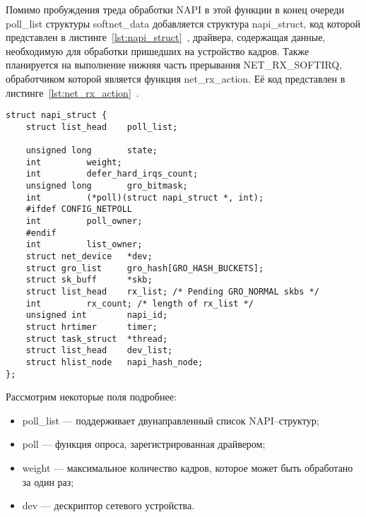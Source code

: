 Помимо пробуждения треда обработки NAPI в этой функции в конец очереди poll\_list структуры  softnet\_data добавляется структура  napi\_struct, код которой представлен в листинге~\ref{lst:napi_struct}~\cite{napi_struct}, драйвера, содержащая данные, необходимую для обработки пришедших на устройство кадров. Также планируется на выполнение нижняя часть прерывания NET\_RX\_SOFTIRQ, обработчиком  которой является функция net\_rx\_action. Её код представлен в листинге~\ref{lst:net_rx_action}~\cite{net_rx_action}.

\begin{center}
	\captionsetup{justification=raggedright,singlelinecheck=off}
	\begin{lstlisting}[label=lst:napi_struct,caption=Структура napi\_struct,showstringspaces=false]
struct napi_struct {
	struct list_head	poll_list;
	
	unsigned long		state;
	int			weight;
	int			defer_hard_irqs_count;
	unsigned long		gro_bitmask;
	int			(*poll)(struct napi_struct *, int);
	#ifdef CONFIG_NETPOLL
	int			poll_owner;
	#endif
	int			list_owner;
	struct net_device	*dev;
	struct gro_list		gro_hash[GRO_HASH_BUCKETS];
	struct sk_buff		*skb;
	struct list_head	rx_list; /* Pending GRO_NORMAL skbs */
	int			rx_count; /* length of rx_list */
	unsigned int		napi_id;
	struct hrtimer		timer;
	struct task_struct	*thread;
	struct list_head	dev_list;
	struct hlist_node	napi_hash_node;
};
	\end{lstlisting}
\end{center}
\FloatBarrier

Рассмотрим некоторые поля подробнее:
\begin{itemize}[label=---]
	\item poll\_list --- поддерживает двунаправленный список NAPI--структур;
	\item poll --- функция опроса, зарегистрированная драйвером; 
	\item weight --- максимальное количество кадров, которое может быть обработано за один раз;
	\item dev --- дескриптор сетевого устройства.
\end{itemize}

